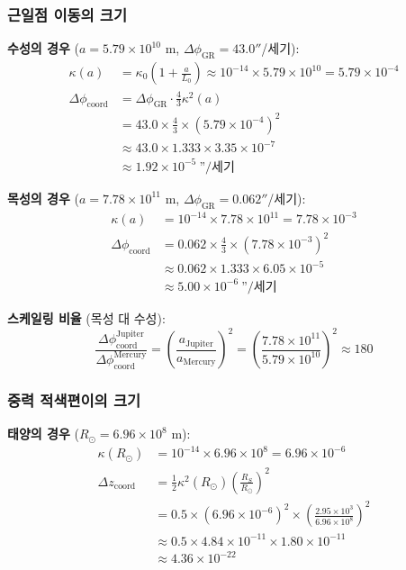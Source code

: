 \documentclass[11pt,a4paper]{article}
\begin{document}
\subsubsection{근일점 이동의 크기}

\textbf{수성의 경우} ($a = 5.79 \times 10^{10}$ m, $\Delta\phi_{\text{GR}} = 43.0''$/세기):
\begin{align}
\kappa(a) &= \kappa_0 \left(1 + \frac{a}{L_0}\right) 
\approx 10^{-14} \times 5.79 \times 10^{10} = 5.79 \times 10^{-4} \\
\Delta\phi_{\text{coord}} &= \Delta\phi_{\text{GR}} \cdot \frac{4}{3} \kappa^2(a) \\
&= 43.0 \times \frac{4}{3} \times (5.79 \times 10^{-4})^2 \\
&\approx 43.0 \times 1.333 \times 3.35 \times 10^{-7} \\
&\approx 1.92 \times 10^{-5} \ \text{''}/\text{세기}
\end{align}

\textbf{목성의 경우} ($a = 7.78 \times 10^{11}$ m, $\Delta\phi_{\text{GR}} = 0.062''$/세기):
\begin{align}
\kappa(a) &= 10^{-14} \times 7.78 \times 10^{11} = 7.78 \times 10^{-3} \\
\Delta\phi_{\text{coord}} &= 0.062 \times \frac{4}{3} \times (7.78 \times 10^{-3})^2 \\
&\approx 0.062 \times 1.333 \times 6.05 \times 10^{-5} \\
&\approx 5.00 \times 10^{-6}~\text{''}/\text{세기}
\end{align}

\textbf{스케일링 비율} (목성 대 수성):
\begin{equation}
\frac{\Delta\phi_{\text{coord}}^{\text{Jupiter}}}{\Delta\phi_{\text{coord}}^{\text{Mercury}}}
= \left(\frac{a_{\text{Jupiter}}}{a_{\text{Mercury}}}\right)^2 
= \left(\frac{7.78 \times 10^{11}}{5.79 \times 10^{10}}\right)^2 \approx 180
\end{equation}

\subsubsection{중력 적색편이의 크기}

\textbf{태양의 경우} ($R_\odot = 6.96 \times 10^8$ m):
\begin{align}
\kappa(R_\odot) &= 10^{-14} \times 6.96 \times 10^8 = 6.96 \times 10^{-6} \\
\Delta z_{\text{coord}} &= \frac{1}{2} \kappa^2(R_\odot) \left(\frac{R_S}{R_\odot}\right)^2 \\
&= 0.5 \times (6.96 \times 10^{-6})^2 \times \left(\frac{2.95 \times 10^3}{6.96 \times 10^8}\right)^2 \\
&\approx 0.5 \times 4.84 \times 10^{-11} \times 1.80 \times 10^{-11} \\
&\approx 4.36 \times 10^{-22}
\end{align}
\end{document}
